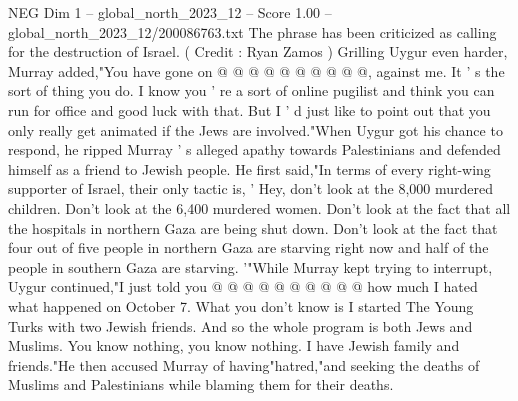 \begin{textsample}{NEG Dim 1 – global\_north\_2023\_12 – Score 1.00 – global\_north\_2023\_12/200086763.txt}
The phrase has been criticized as calling for the destruction of Israel. ( Credit : Ryan Zamos ) Grilling Uygur even harder, Murray added,"You have gone on @ @ @ @ @ @ @ @ @ @, against me.
It ' s the sort of thing you do.
I know you ' re a sort of online pugilist and think you can run for office and good luck with that.
But I ' d just like to point out that you only really get animated if the Jews are involved."When Uygur got his chance to respond, he ripped Murray ' s alleged apathy towards Palestinians and defended himself as a friend to Jewish people.
He first said,"In terms of every right-wing supporter of Israel, their only tactic is, ' Hey, don't look at the 8,000 murdered children.
Don't look at the 6,400 murdered women.
Don't look at the fact that all the hospitals in northern Gaza are being shut down.
Don't look at the fact that four out of five people in northern Gaza are starving right now and half of the people in southern Gaza are starving. '"While Murray kept trying to interrupt, Uygur continued,"I just told you @ @ @ @ @ @ @ @ @ @ how much I hated what happened on October 7.
What you don't know is I started The Young Turks with two Jewish friends.
And so the whole program is both Jews and Muslims.
You know nothing, you know nothing.
I have Jewish family and friends."He then accused Murray of having"hatred,"and seeking the deaths of Muslims and Palestinians while blaming them for their deaths.

\end{textsample}
